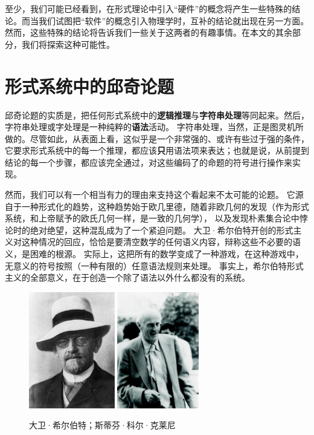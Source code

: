 \documentclass[a4paper,12pt]{article}
\begin{document}
至少，我们可能已经看到，在形式理论中引入“硬件”的概念将产生一些特殊的结论。而当我们试图把“软件”的概念引入物理学时，互补的结论就出现在另一方面。
然而，这些特殊的结论将告诉我们一些关于这两者的有趣事情。在本文的其余部分，我们将探索这种可能性。

\section{形式系统中的邱奇论题}

邱奇论题的实质是，把任何形式系统中的\textbf{\gls{逻辑推理}}与\textbf{\gls{字符串处理}}等同起来。然后，\gls{字符串处理}或字处理是一种纯粹的\textbf{\gls{语法}}活动。
\gls{字符串处理}，当然，正是图灵机所做的。尽管如此，从表面上看，这似乎是一个非常强的、或许有些过于强的条件，
它要求\gls{形式系统}中的每一个推理，都应该\textbf{只}用\gls{语法项}来表达；也就是说，从前提到结论的每一个步骤，都应该完全通过，对这些编码了的命题的符号进行操作来实现。

然而，我们可以有一个相当有力的理由来支持这个看起来不太可能的论题。
它源自于一种形式化的趋势，这种趋势始于欧几里德，随着非欧几何的发现（作为形式系统，和上帝赋予的欧氏几何一样，是一致的几何学），
以及发现朴素集合论中悖论时的绝对绝望，这种混乱成为了一个紧迫问题。
大卫·希尔伯特开创的\gls{形式主义}对这种情况的回应，恰恰是要清空数学的任何\gls{语义内容}，辩称这些不必要的\gls{语义}，是困难的根源。
实际上，这把所有的数学变成了一种游戏，在这种游戏中，无意义的符号按照（一种有限的）任意\gls{语法规则}来处理。
事实上，希尔伯特形式主义的全部意义，在于创造一个除了语法以外什么都没有的系统。

\begin{figure}[ht]
\centering
\includegraphics[height=2.0in]{images/hilbert.jpg}
\includegraphics[height=2.0in]{images/kleene.jpg}
\caption{大卫·希尔伯特；斯蒂芬·科尔·克莱尼}
\end{figure}
\end{document}
